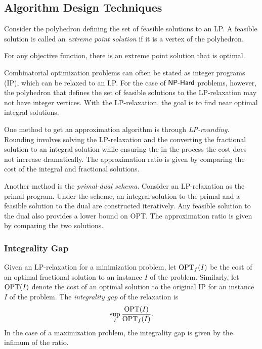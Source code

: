\subsection{Algorithm Design Techniques}

\begin{definition}
    Consider the polyhedron defining the set of feasible solutions to an LP. A feasible solution is called 
    an \emph{extreme point solution} if it is a vertex of the polyhedron. 
    \label{def:extreme_point_sol}
\end{definition}

\begin{theorem}
    For any objective function, there is an extreme point solution that is optimal. 
    \label{thm:opt_extreme_point}
\end{theorem}

Combinatorial optimization problems can often be stated as integer programs (IP), which can be relaxed to an LP. 
For the case of $\textsf{NP-Hard}$ problems, however, the polyhedron that defines the set of feasible solutions to the LP-relaxation 
may not have integer vertices. With the LP-relaxation, the goal is to find near optimal integral solutions. 

One method to get an approximation algorithm is through \emph{LP-rounding}. Rounding involves solving the 
LP-relaxation and the converting the fractional solution to an integral solution while ensuring the in the process the 
cost does not increase dramatically. The approximation ratio is given by comparing the cost of the integral and fractional solutions. 

Another method is the \emph{primal-dual schema}. Consider an LP-relaxation as the primal program. Under the scheme, 
an integral solution to the primal and a feasible solution to the dual are constructed iteratively.
Any feasible solution to the dual also provides a lower bound on OPT. The approximation ratio is given by 
comparing the two solutions.  

\subsubsection{Integrality Gap}

\begin{definition}
    Given an LP-relaxation for a minimization problem, let $\mathrm{OPT}_{f}(I)$ be the cost 
    of an optimal fractional solution to an instance $I$ of the problem. Similarly, let 
    $\mathrm{OPT}(I)$ denote the cost of an optimal solution to the original IP for an instance $I$ of the problem. 
    The \emph{integrality gap} of the relaxation is 
    \[
        \sup_{I} \frac{\mathrm{OPT}(I)}{\mathrm{OPT}_f (I)}. 
    \]
    In the case of a maximization problem, the integrality gap is given by the infimum of the ratio. 
    \label{def:integrality_gap}
\end{definition}

